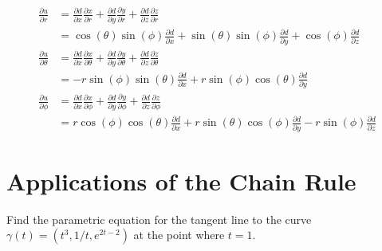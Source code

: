 \documentclass[12pt]{book}
\newenvironment{exercise}[2][Exercise]{\begin{trivlist}
\item[\hskip \labelsep {\bfseries #1}\hskip \labelsep {\bfseries #2.}]}{\end{trivlist}}
\begin{document}
\begin{exercise}{7.2.7}
\begin{exercise}{9.3.9}
	\begin{align*}
	\frac{\partial u}{\partial r} &= \frac{\partial d}{\partial x} \frac{\partial x}{\partial r} + \frac{\partial d }{\partial y} \frac{\partial y}{\partial r} + \frac{\partial d}{\partial z} \frac{\partial z}{\partial r} \\
	&= \cos(\theta) \sin(\phi) \frac{\partial d}{\partial x} + \sin(\theta) \sin(\phi) \frac{\partial d}{\partial y} + \cos(\phi) \frac{\partial d}{\partial z} \\
	\frac{\partial u}{\partial \theta} &= \frac{\partial d}{\partial x} \frac{\partial x}{\partial \theta} + \frac{\partial d }{\partial y} \frac{\partial y}{\partial \theta} + \frac{\partial d}{\partial z} \frac{\partial z}{\partial \theta}\\
	&= - r \sin{\left (\phi \right )} \sin{\left (\theta \right )} \frac{\partial d}{\partial x} + r \sin{\left (\phi \right )} \cos{\left (\theta \right )} \frac{\partial d}{\partial y}  \\
	\frac{\partial u}{\partial \phi} &= \frac{\partial d}{\partial x} \frac{\partial x}{\partial \phi} + \frac{\partial d }{\partial y} \frac{\partial y}{\partial \phi} + \frac{\partial d}{\partial z} \frac{\partial z}{\partial \phi} \\
	&= r \cos{\left (\phi \right )} \cos{\left (\theta \right )} \frac{\partial d}{\partial x} + r \sin{\left (\theta \right )} \cos{\left (\phi \right )} \frac{\partial d}{\partial y} - r \sin{\left (\phi \right )} \frac{\partial d}{\partial z}
	\end{align*}
\end{exercise}




\section{Applications of the Chain Rule}


\begin{exercise}{9.4.3}
    Find the parametric equation for the tangent line to the curve $\gamma(t) = \left( t^3, 1/t, e^{2t-2}\right)$ at the point where $t=1$. \\


\end{exercise}
\end{exercise}
\end{document}
